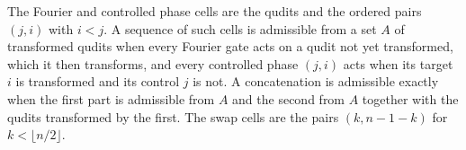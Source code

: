 \begin{definition}
    \label{def:qft_order}
    \leanok
    The Fourier and controlled phase cells are the qudits and the ordered pairs
    $(j,i)$ with $i<j$. A sequence of such cells is admissible from a set $A$ of
    transformed qudits when every Fourier gate acts on a qudit not yet transformed,
    which it then transforms, and every controlled phase $(j,i)$ acts when its
    target $i$ is transformed and its control $j$ is not. A concatenation is admissible
    exactly when the first part is admissible from $A$ and the second from $A$
    together with the qudits transformed by the first. The swap cells are the pairs
    $(k,n-1-k)$ for $k<\lfloor n/2\rfloor$.
\end{definition}

